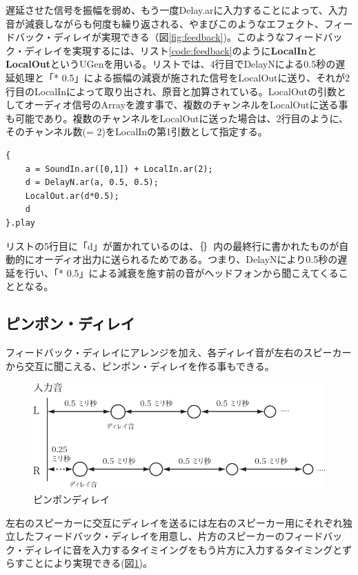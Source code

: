 \documentclass{jsarticle}
\begin{document}
遅延させた信号を振幅を弱め、もう一度Delay.arに入力することによって、入力音が減衰しながらも何度も繰り返される、やまびこのようなエフェクト、フィードバック・ディレイが実現できる（図\ref{fig:feedback})。このようなフィードバック・ディレイを実現するには、リスト\ref{code:feedback}のように{\bf LocalIn}と{\bf LocalOut}というUGenを用いる。リストでは、4行目でDelayNによる0.5秒の遅延処理と「* 0.5」による振幅の減衰が施された信号をLocalOutに送り、それが2行目のLocalInによって取り出され、原音と加算されている。LocalOutの引数としてオーディオ信号のArrayを渡す事で、複数のチャンネルをLocalOutに送る事も可能であり。複数のチャンネルをLocalOutに送った場合は、2行目のように、そのチャンネル数(= 2)をLocalInの第1引数として指定する。

\begin{lstlisting}[caption=フィードバック・ディレイ, label=code:feedback]
{
	a = SoundIn.ar([0,1]) + LocalIn.ar(2);
	d = DelayN.ar(a, 0.5, 0.5);
	LocalOut.ar(d*0.5);
	d
}.play
\end{lstlisting}

リストの5行目に「d」が置かれているのは、｛｝内の最終行に書かれたものが自動的にオーディオ出力に送られるためである。つまり、DelayNにより0.5秒の遅延を行い、「* 0.5」による減衰を施す前の音がヘッドフォンから聞こえてくることとなる。

\subsection{ピンポン・ディレイ}
フィードバック・ディレイにアレンジを加え、各ディレイ音が左右のスピーカーから交互に聞こえる、ピンポン・ディレイを作る事もできる。

\begin{figure}[htbp]
	\begin{center}
		\includegraphics[scale=0.65]{pingpong.pdf}
	\end{center}
	\label{fig:pingpong}
	\caption{ピンポンディレイ}
\end{figure}

左右のスピーカーに交互にディレイを送るには左右のスピーカー用にそれぞれ独立したフィードバック・ディレイを用意し、片方のスピーカーのフィードバック・ディレイに音を入力するタイミイングをもう片方に入力するタイミングとずらすことにより実現できる(図\ref{fig:pingpong})。
\end{document}
